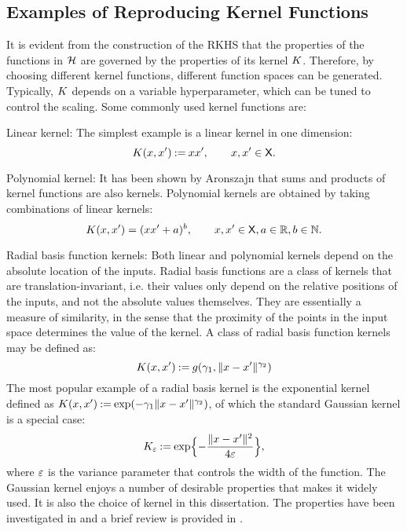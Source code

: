 
\subsection{Examples of Reproducing Kernel Functions}
It is evident from the construction of the RKHS that the properties of the functions in ${\cal H}$ are governed by the properties of its kernel $K$. Therefore, by choosing different kernel functions, different function spaces can be generated. Typically, $K$ depends on a variable hyperparameter, which can be tuned to control the scaling. Some commonly used kernel functions are:
\begin{arabnum}
\item Linear kernel: The simplest example is a linear kernel in one dimension:
\begin{equation}
K(x,x') \mathbin{:=} x x', \qquad x,x' \in {\sf X}.
\end{equation}
\item Polynomial kernel: It has been shown by Aronszajn \cite{aro50} that sums and products of kernel functions are also kernels. Polynomial kernels are obtained by taking combinations of linear kernels:
\begin{equation}
K(x,x') = (xx' + a)^b, \qquad x,x'\in {\sf X}, a \in \mathbb{R}, b \in \mathbb{N}.
\end{equation}
\item Radial basis function kernels: Both linear and polynomial kernels depend on the absolute location of the inputs. Radial basis functions are a class of kernels that are translation-invariant, i.e. their values only depend on the relative positions of the inputs, and not the absolute values themselves. They are essentially a measure of similarity, in the sense that the proximity of the points in the input space determines the value of the kernel. A class of radial basis function kernels may be defined as:
\begin{equation}
K(x,x') \mathbin{:=} g(\gamma_1, \|x-x'\|^{\gamma_2})
\end{equation}  
The most popular example of a radial basis kernel is the exponential kernel defined as $K(x,x') \mathbin{:=} \exp(-\gamma_1 \|x - x'\|^{\gamma_2})$, of which the standard Gaussian kernel is a special case:
\begin{equation}
\Kern_\epsy \eqdef \exp\Bigl\{-\frac{\|x-x'\|^2}{4 \epsy}\Bigr\},
\label{e:rkhs_gaussian_kernel}
\end{equation}
where $\varepsilon$ is the variance parameter that controls the width of the function. The Gaussian kernel enjoys a number of desirable properties that makes it widely used. It is also the choice of kernel in this dissertation. The properties have been investigated in \cite{min10,stehussco06} and a brief review is provided in . 
\end{arabnum}


